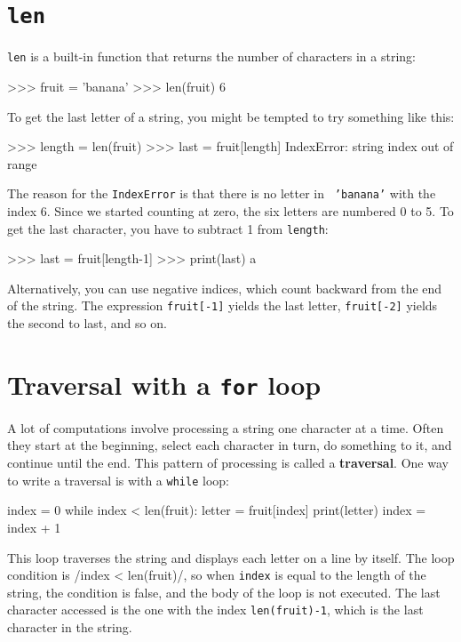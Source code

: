 \section{{\tt len}}


{\tt len} is a built-in function that returns the number of characters
in a string:

\beforeverb
\begin{pycode}
>>> fruit = 'banana'
>>> len(fruit)
6
\end{pycode}
\afterverb
%
To get the last letter of a string, you might be tempted to try something
like this:


\beforeverb
\begin{pycode}
>>> length = len(fruit)
>>> last = fruit[length]
IndexError: string index out of range
\end{pycode}
\afterverb
%
The reason for the {\tt IndexError} is that there is no letter in {\tt
'banana'} with the index 6.  Since we started counting at zero, the
six letters are numbered 0 to 5.  To get the last character, you have
to subtract 1 from {\tt length}:

\beforeverb
\begin{pycode}
>>> last = fruit[length-1]
>>> print(last)
a
\end{pycode}
\afterverb
%
Alternatively, you can use negative indices, which count backward from
the end of the string.  The expression {\tt fruit[-1]} yields the last
letter, {\tt fruit[-2]} yields the second to last, and so on.



\section{Traversal with a {\tt for} loop}
\label{for}


A lot of computations involve processing a string one character at a
time.  Often they start at the beginning, select each character in
turn, do something to it, and continue until the end.  This pattern of
processing is called a {\bf traversal}.  One way to write a traversal
is with a {\tt while} loop:

\beforeverb
\begin{pycode}
index = 0
while index < len(fruit):
    letter = fruit[index]
    print(letter)
    index = index + 1
\end{pycode}
\afterverb
%
This loop traverses the string and displays each letter on a line by
itself.  The loop condition is {\pyinline/index < len(fruit)/}, so
when {\tt index} is equal to the length of the string, the
condition is false, and the body of the loop is not executed.  The
last character accessed is the one with the index {\tt len(fruit)-1},
which is the last character in the string.

